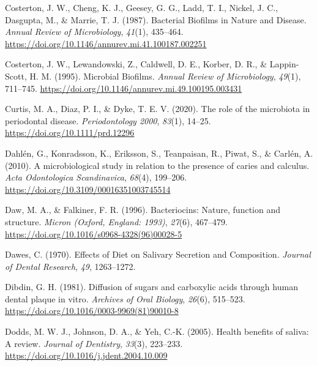 \documentclass[
  letterpaper,
]{book}
\newlength{\cslhangindent}
\newlength{\cslentryspacingunit} %
\newenvironment{CSLReferences}[2] %
 {%
  \setlength{\parindent}{0pt}
  \ifodd #1
  \let\oldpar\par
  \def\par{\hangindent=\cslhangindent\oldpar}
  \fi
  \setlength{\parskip}{#2\cslentryspacingunit}
 }%
 {}
\begin{document}
\begin{CSLReferences}{1}{0}
\leavevmode{}%
Costerton, J. W., Cheng, K. J., Geesey, G. G., Ladd, T. I., Nickel, J.
C., Dasgupta, M., \& Marrie, T. J. (1987). Bacterial {Biofilms} in
{Nature} and {Disease}. \emph{Annual Review of Microbiology},
\emph{41}(1), 435--464.
\url{https://doi.org/10.1146/annurev.mi.41.100187.002251}

\leavevmode{}%
Costerton, J. W., Lewandowski, Z., Caldwell, D. E., Korber, D. R., \&
Lappin-Scott, H. M. (1995). Microbial {Biofilms}. \emph{Annual Review of
Microbiology}, \emph{49}(1), 711--745.
\url{https://doi.org/10.1146/annurev.mi.49.100195.003431}

\leavevmode{}%
Curtis, M. A., Diaz, P. I., \& Dyke, T. E. V. (2020). The role of the
microbiota in periodontal disease. \emph{Periodontology 2000},
\emph{83}(1), 14--25. \url{https://doi.org/10.1111/prd.12296}

\leavevmode{}%
Dahlén, G., Konradsson, K., Eriksson, S., Teanpaisan, R., Piwat, S., \&
Carlén, A. (2010). A microbiological study in relation to the presence
of caries and calculus. \emph{Acta Odontologica Scandinavica},
\emph{68}(4), 199--206. \url{https://doi.org/10.3109/00016351003745514}

\leavevmode{}%
Daw, M. A., \& Falkiner, F. R. (1996). Bacteriocins: Nature, function
and structure. \emph{Micron (Oxford, England: 1993)}, \emph{27}(6),
467--479. \url{https://doi.org/10.1016/s0968-4328(96)00028-5}

\leavevmode{}%
Dawes, C. (1970). Effects of {Diet} on {Salivary Secretion} and
{Composition}. \emph{Journal of Dental Research}, \emph{49}, 1263--1272.

\leavevmode{}%
Dibdin, G. H. (1981). Diffusion of sugars and carboxylic acids through
human dental plaque in vitro. \emph{Archives of Oral Biology},
\emph{26}(6), 515--523.
\url{https://doi.org/10.1016/0003-9969(81)90010-8}

\leavevmode{}%
Dodds, M. W. J., Johnson, D. A., \& Yeh, C.-K. (2005). Health benefits
of saliva: A review. \emph{Journal of Dentistry}, \emph{33}(3),
223--233. \url{https://doi.org/10.1016/j.jdent.2004.10.009}


\end{CSLReferences}
\end{document}
